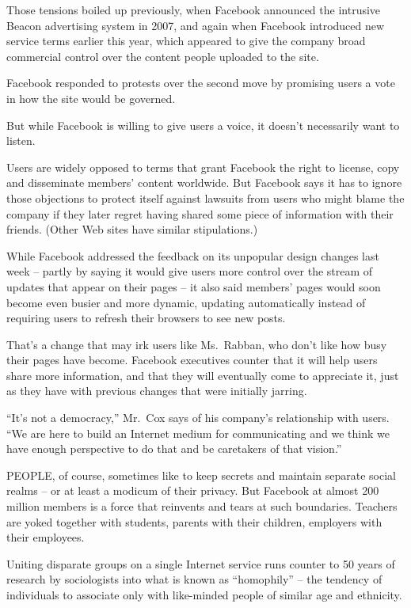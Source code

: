 \documentclass[12pt,a4paper,onecolumn]{article}
\begin{document}
Those tensions boiled up previously, when Facebook announced the intrusive Beacon advertising system
in 2007, and again when Facebook introduced new service terms earlier this year, which appeared to
give the company broad commercial control over the content people uploaded to the site.

Facebook responded to protests over the second move by promising users a vote in how the site would
be governed.

But while Facebook is willing to give users a voice, it doesn't necessarily want to listen.

Users are widely opposed to terms that grant Facebook the right to license, copy and disseminate
members' content worldwide. But Facebook says it has to ignore those objections to protect itself
against lawsuits from users who might blame the company if they later regret having shared some
piece of information with their friends. (Other Web sites have similar stipulations.)

While Facebook addressed the feedback on its unpopular design changes last week -- partly by saying
it would give users more control over the stream of updates that appear on their pages -- it also
said members' pages would soon become even busier and more dynamic, updating automatically instead
of requiring users to refresh their browsers to see new posts.

That's a change that may irk users like Ms.~Rabban, who don't like how busy their pages have become.
Facebook executives counter that it will help users share more information, and that they will
eventually come to appreciate it, just as they have with previous changes that were initially
jarring.

``It's not a democracy,'' Mr.~Cox says of his company's relationship with users. ``We are here to
build an Internet medium for communicating and we think we have enough perspective to do that and be
caretakers of that vision.''

PEOPLE, of course, sometimes like to keep secrets and maintain separate social realms -- or at least
a modicum of their privacy. But Facebook at almost 200 million members is a force that reinvents and
tears at such boundaries. Teachers are yoked together with students, parents with their children,
employers with their employees.

Uniting disparate groups on a single Internet service runs counter to 50 years of research by
sociologists into what is known as ``homophily'' -- the tendency of individuals to associate only
with like-minded people of similar age and ethnicity.
\end{document}
